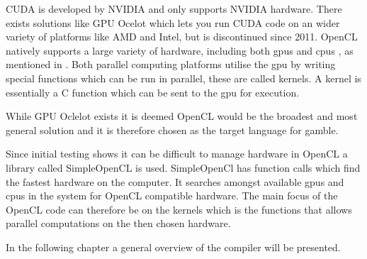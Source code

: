 CUDA is developed by NVIDIA and only supports NVIDIA hardware.
There exists solutions like GPU Ocelot which lets you run CUDA code on an wider variety of platforms like AMD and Intel, but is discontinued since 2011. \citep{Diamos:2010:ODO:1854273.1854318}
OpenCL natively supports a large variety of hardware, including both \acrshort{gpu}s and \acrshort{cpu}s , as mentioned in .
Both parallel computing platforms utilise the \acrshort{gpu} by writing special functions which can be run in parallel, these are called kernels.
A kernel is essentially a C function which can be sent to the \acrshort{gpu} for execution.

While GPU Oclelot exists it is deemed OpenCL would be the broadest and most general solution and it is therefore chosen as the target language for \gls{gamble}.

Since initial testing shows it can be difficult to manage hardware in OpenCL a library called SimpleOpenCL is used.
SimpleOpenCl has function calls which find the fastest hardware on the computer.
It searches amongst available \acrshort{gpu}s and \acrshort{cpu}s in the system for OpenCL compatible hardware. \citep{simpeCL}
The main focus of the OpenCL code can therefore be on the kernels which is the functions that allows parallel computations on the then chosen hardware.

In the following chapter a general overview of the compiler will be presented.
